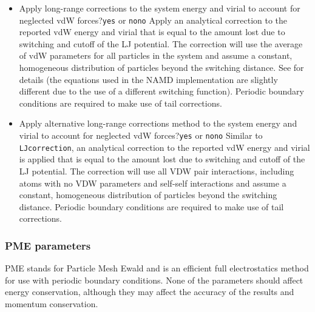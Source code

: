\begin{itemize}
\item
{}
{Apply long-range corrections to the system energy and virial to
account for neglected vdW forces?}{{\tt yes} or {\tt no}}{{\tt no}}
{Apply an analytical correction to the reported vdW energy and virial
that is equal to the amount lost due to switching and cutoff of the LJ
potential. The correction will use the average of vdW parameters for
all particles in the system and assume a constant, homogeneous
distribution of particles beyond the switching distance. See 
\cite{Shirts2007} for details (the equations used in the NAMD
implementation are slightly different due to the use of a different
switching function). Periodic boundary conditions are required to make
use of tail corrections.
}

\item
{}
{Apply alternative long-range corrections method to the system energy and virial to
account for neglected vdW forces?}{{\tt yes} or {\tt no}}{{\tt no}}
{Similar to {\tt LJcorrection}, an analytical correction to the reported 
vdW energy and virial is applied that is equal to the amount lost due to switching and 
cutoff of the LJ potential. The correction will use all VDW pair interactions,
including atoms with no VDW parameters and self-self interactions and assume a constant, 
homogeneous distribution of particles beyond the switching distance. 
Periodic boundary conditions are required to make use of tail corrections.
}
\end{itemize}


\subsubsection{PME parameters}

PME stands for Particle Mesh Ewald and is an efficient
full electrostatics method for use with periodic boundary conditions.
None of the parameters should affect energy conservation, although they may affect the accuracy of the results and momentum conservation.

